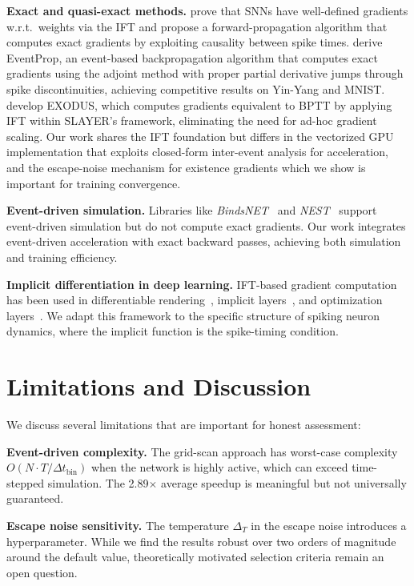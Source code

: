 \documentclass[10pt,twocolumn]{article}
\begin{document}
\textbf{Exact and quasi-exact methods.} \citet{lee2023forwardprop} prove that SNNs have well-defined gradients w.r.t.\ weights via the IFT and propose a forward-propagation algorithm that computes exact gradients by exploiting causality between spike times. \citet{wunderlich2021eventprop} derive EventProp, an event-based backpropagation algorithm that computes exact gradients using the adjoint method with proper partial derivative jumps through spike discontinuities, achieving competitive results on Yin-Yang and MNIST. \citet{bauer2023exodus} develop EXODUS, which computes gradients equivalent to BPTT by applying IFT within SLAYER's framework, eliminating the need for ad-hoc gradient scaling. Our work shares the IFT foundation but differs in the vectorized GPU implementation that exploits closed-form inter-event analysis for acceleration, and the escape-noise mechanism for existence gradients which we show is important for training convergence.

\textbf{Event-driven simulation.} Libraries like \textit{BindsNET}~\citep{dellanna2018bindsnets} and \textit{NEST}~\citep{gewaltig2007nest} support event-driven simulation but do not compute exact gradients. Our work integrates event-driven acceleration with exact backward passes, achieving both simulation and training efficiency.

\textbf{Implicit differentiation in deep learning.} IFT-based gradient computation has been used in differentiable rendering~\citep{nimier2019mitsuba}, implicit layers~\citep{de2019implicit}, and optimization layers~\citep{agrawal2019differentiable}. We adapt this framework to the specific structure of spiking neuron dynamics, where the implicit function is the spike-timing condition.

\section{Limitations and Discussion}

We discuss several limitations that are important for honest assessment:

\textbf{Event-driven complexity.} The grid-scan approach has worst-case complexity $O(N \cdot T/\Delta t_{\text{bin}})$ when the network is highly active, which can exceed time-stepped simulation. The 2.89$\times$ average speedup is meaningful but not universally guaranteed.

\textbf{Escape noise sensitivity.} The temperature $\Delta_T$ in the escape noise introduces a hyperparameter. While we find the results robust over two orders of magnitude around the default value, theoretically motivated selection criteria remain an open question.
\end{document}
